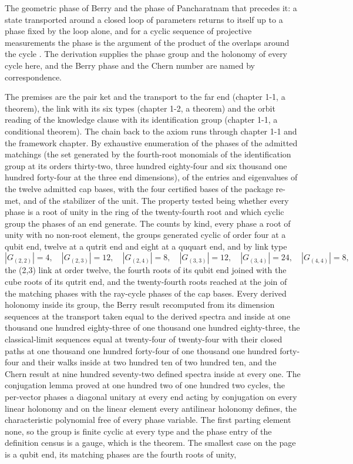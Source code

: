 \begin{chbridge}
The geometric phase of Berry and the phase of Pancharatnam that precedes it: a state transported around a closed loop of parameters returns to itself up to a phase fixed by the loop alone, and for a cyclic sequence of projective measurements the phase is the argument of the product of the overlaps around the cycle \cite{Berry1984,Pancharatnam1956}. The derivation supplies the phase group and the holonomy of every cycle here, and the Berry phase and the Chern number are named by correspondence.
\end{chbridge}
\begin{chproof}[census]
The premises are the pair ket and the transport to the far end (chapter 1-1, a theorem), the link with its six types (chapter 1-2, a theorem) and the orbit reading of the knowledge clause with its identification group (chapter 1-1, a conditional theorem). The chain back to the axiom runs through chapter 1-1 and the framework chapter. By exhaustive enumeration of the phases of the admitted matchings (the set generated by the fourth-root monomials of the identification group at its orders thirty-two, three hundred eighty-four and six thousand one hundred forty-four at the three end dimensions), of the entries and eigenvalues of the twelve admitted cap bases, with the four certified bases of the package re-met, and of the stabilizer of the unit. The property tested being whether every phase is a root of unity in the ring of the twenty-fourth root and which cyclic group the phases of an end generate. The counts by kind, every phase a root of unity with no non-root element, the groups generated cyclic of order four at a qubit end, twelve at a qutrit end and eight at a ququart end, and by link type
\begin{equation}
|G_{(2,2)}| = 4,\quad |G_{(2,3)}| = 12,\quad |G_{(2,4)}| = 8,\quad |G_{(3,3)}| = 12,\quad |G_{(3,4)}| = 24,\quad |G_{(4,4)}| = 8 ,
\end{equation}
the (2,3) link at order twelve, the fourth roots of its qubit end joined with the cube roots of its qutrit end, and the twenty-fourth roots reached at the join of the matching phases with the ray-cycle phases of the cap bases. Every derived holonomy inside its group, the Berry result recomputed from its dimension sequences at the transport taken equal to the derived spectra and inside at one thousand one hundred eighty-three of one thousand one hundred eighty-three, the classical-limit sequences equal at twenty-four of twenty-four with their closed paths at one thousand one hundred forty-four of one thousand one hundred forty-four and their walks inside at two hundred ten of two hundred ten, and the Chern result at nine hundred seventy-two defined spectra inside at every one. The conjugation lemma proved at one hundred two of one hundred two cycles, the per-vector phases a diagonal unitary at every end acting by conjugation on every linear holonomy and on the linear element every antilinear holonomy defines, the characteristic polynomial free of every phase variable. The first parting element none, so the group is finite cyclic at every type and the phase entry of the definition census is a gauge, which is the theorem. The smallest case on the page is a qubit end, its matching phases are the fourth roots of unity,

\end{chproof}
